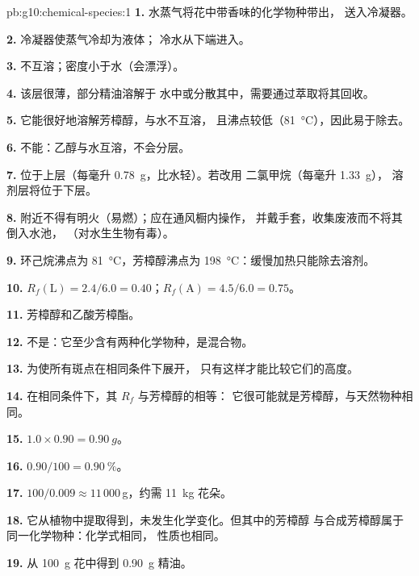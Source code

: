 \begin{solution}{pb:g10:chemical-species:1}
\textbf{1.} 水蒸气将花中带香味的化学物种带出，
送入冷凝器。

\textbf{2.} 冷凝器使蒸气冷却为液体；
冷水从下端进入。

\textbf{3.} 不互溶；密度小于水（会漂浮）。

\textbf{4.} 该层很薄，部分精油溶解于
水中或分散其中，需要通过萃取将其回收。

\textbf{5.} 它能很好地溶解芳樟醇，与水不互溶，
且沸点较低（\qty{81}{\celsius}），因此易于除去。

\textbf{6.} 不能：乙醇与水互溶，不会分层。

\textbf{7.} 位于上层（每毫升 \qty{0.78}{g}，比水轻）。若改用
二氯甲烷（每毫升 \qty{1.33}{g}），
溶剂层将位于下层。

\textbf{8.} 附近不得有明火（易燃）；应在通风橱内操作，
并戴手套，收集废液而不将其倒入水池，
（对水生生物有毒）。

\textbf{9.} 环己烷沸点为 \qty{81}{\celsius}，芳樟醇沸点为
\qty{198}{\celsius}：缓慢加热只能除去溶剂。

\textbf{10.} $R_f(\text{L}) = 2.4/6.0 = 0.40$；$R_f(\text{A}) = 4.5/6.0
= 0.75$。

\textbf{11.} 芳樟醇和乙酸芳樟酯。

\textbf{12.} 不是：它至少含有两种化学物种，是混合物。

\textbf{13.} 为使所有斑点在相同条件下展开，
只有这样才能比较它们的高度。

\textbf{14.} 在相同条件下，其 $R_f$ 与芳樟醇的相等：
它很可能就是芳樟醇，与天然物种相同。

\textbf{15.} $1.0 \times 0.90 = \qty{0.90}{g}$。

\textbf{16.} $0.90/100 = \qty{0.90}{\percent}$。

\textbf{17.} $100/0.009 \approx 11\,000$\,g，约需
\qty{11}{kg} 花朵。

\textbf{18.} 它从植物中提取得到，未发生化学变化。但其中的芳樟醇
与合成芳樟醇属于同一化学物种：化学式相同，
性质也相同。

\textbf{19.} 从 \qty{100}{g} 花中得到 \qty{0.90}{g} 精油。
\end{solution}
